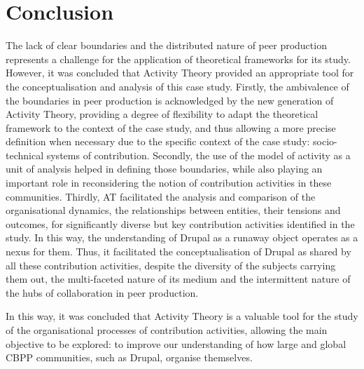 \section{Conclusion}
\label{sec:at-conclusion}

The lack of clear boundaries and the distributed nature of peer production represents a challenge for the application of theoretical frameworks for its study. However, it was concluded that Activity Theory provided an appropriate tool for the conceptualisation and analysis of this case study. Firstly, the ambivalence of the boundaries in peer production is acknowledged by the new generation of Activity Theory, providing a degree of flexibility to adapt the theoretical framework to the context of the case study, and thus allowing a more precise definition when necessary due to the specific context of the case study: socio-technical systems of contribution. Secondly, the use of the model of activity as a unit of analysis helped in defining those boundaries, while also playing an important role in reconsidering the notion of contribution activities in these communities. Thirdly, AT facilitated the analysis and comparison of the organisational dynamics, the relationships between entities, their tensions and outcomes, for significantly diverse but key contribution activities identified in the study. In this way, the understanding of Drupal as a runaway object operates as a nexus for them. Thus, it facilitated the conceptualisation of Drupal as shared by all these contribution activities, despite the diversity of the subjects carrying them out, the multi-faceted nature of its medium and the intermittent nature of the hubs of collaboration in peer production.

In this way, it was concluded that Activity Theory is a valuable tool for the study of the organisational processes of contribution activities, allowing the main objective to be explored: to improve our understanding of how large and global CBPP communities, such as Drupal, organise themselves.